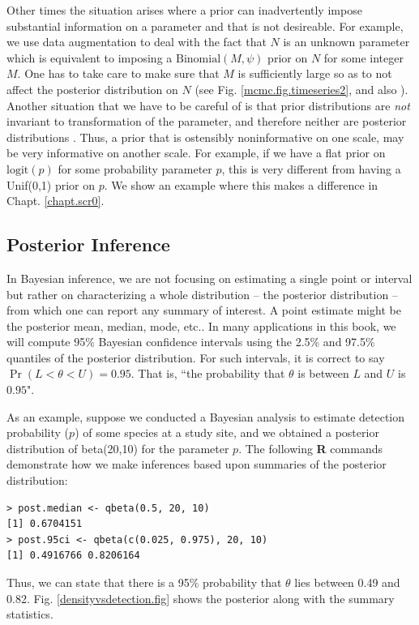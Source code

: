 Other times the situation arises where a prior can inadvertently impose
substantial information on a parameter and that is not desireable.
For example, we use data augmentation
to deal with the fact that $N$ is an unknown parameter
 \citep{royle_etal:2007} which is equivalent to imposing a $\mbox{Binomial}(M,\psi)$
 prior on $N$ for some integer $M$. One has to take care to make sure
 that $M$ is sufficiently large so as to not affect the posterior
 distribution on $N$ (see Fig. \ref{mcmc.fig.timeseries2}, and also
 \citet[][Ch. 5]{kery_schaub:2011}).
Another situation that we have
 to be careful of is that
prior 
distributions are {\it not} invariant to transformation of the
parameter,
and therefore neither are posterior distributions
\citep[][sec. 6.2.1]{link_barker:2010}. Thus, a prior that is ostensibly
noninformative on one scale, may be very informative on another
scale. 
For example, if we have a flat prior on $\mbox{logit}(p)$ for some probability
parameter $p$, this is very different from having a 
\mbox{Unif}(0,1) prior 
on $p$. We show an example where this makes a difference in Chapt. \ref{chapt.scr0}.

\subsection{Posterior Inference}

In Bayesian inference, we are not focusing on estimating a single
point or interval but rather on characterizing a whole distribution --
the posterior distribution -- from which one can report any summary of
interest. A point estimate might be the posterior mean, median, mode,
etc..  In many applications in this book, we will compute 95\%
Bayesian confidence intervals using the 2.5\% and 97.5\% quantiles of the
posterior distribution. For such intervals, it is correct to say
$\Pr(L < \theta < U) = 0.95$. That is, ``the probability that $\theta$
is between $L$ and $U$ is $0.95$". 

As an
example, suppose we conducted a Bayesian analysis to estimate
detection probability ($p$) of some species at a study site, and we
obtained a posterior distribution of beta(20,10) for the parameter
$p$. The following {\bf R} commands demonstrate how we make inferences based
upon summaries of the posterior distribution:
\begin{verbatim}
> post.median <- qbeta(0.5, 20, 10)
[1] 0.6704151
> post.95ci <- qbeta(c(0.025, 0.975), 20, 10)
[1] 0.4916766 0.8206164
\end{verbatim}
Thus, we can state that there is a 95\% probability that $\theta$ lies
between 0.49 and 0.82. Fig. \ref{densityvsdetection.fig} shows the
posterior along with the summary statistics.

